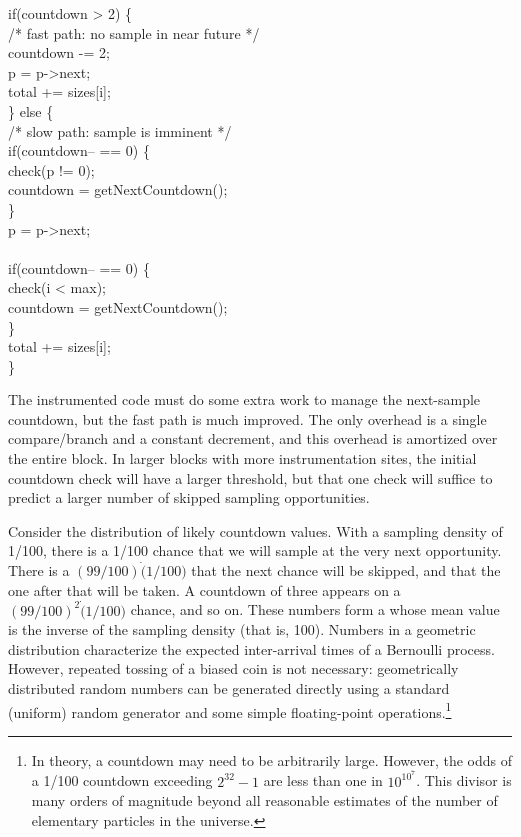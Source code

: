 \begin{code}
  if(countdown > 2) \{ \\
  \> /* fast path: no sample in near future */ \\
  \> countdown -= 2; \\
  \> \up p = p->next; \\
  \> \up total += sizes[i]; \\
  \} else \{ \\
  \> /* slow path: sample is imminent */ \\
  \> if(countdown-- == 0) \{ \\
  \>\> check(p != 0); \\
  \>\> countdown = getNextCountdown(); \\
  \> \} \\
  \> \up p = p->next; \\
  \> \\
  \> if(countdown-- == 0) \{ \\
  \>\> check(i < max); \\
  \>\> countdown = getNextCountdown(); \\
  \> \} \\
  \> \up total += sizes[i]; \\
  \}
\end{code}

The instrumented code must do some extra work to manage the
next-sample countdown, but the fast path is much improved.  The only
overhead is a single compare/branch and a constant decrement, and this
overhead is amortized over the entire block.  In larger blocks with
more instrumentation sites, the initial countdown check will have a
larger threshold, but that one check will suffice to predict a larger
number of skipped sampling opportunities.

Consider the distribution of likely countdown values.  With a sampling
density of 1/100, there is a 1/100 chance that we will sample at the
very next opportunity.  There is a $(99/100)\dot(1/100)$ that the next
chance will be skipped, and that the one after that will be taken.  A
countdown of three appears on a $(99/100)^2\dot(1/100)$ chance, and so
on.  These numbers form a  whose mean
value is the inverse of the sampling density (that is, 100).  Numbers
in a geometric distribution characterize the expected inter-arrival
times of a Bernoulli process.  However, repeated tossing of a biased
coin is not necessary: geometrically distributed random numbers can be
generated directly using a standard (uniform) random generator and
some simple floating-point operations.\footnote{In theory, a countdown
  may need to be arbitrarily large.  However, the odds of a 1/100
  countdown exceeding $2^{32}-1$ are less than one in $10^{10^7}$.
  This divisor is many orders of magnitude beyond all reasonable
  estimates of the number of elementary particles in the universe.}

